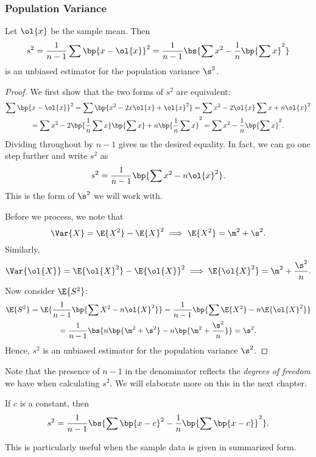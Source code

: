 \subsubsection{Population Variance}

\begin{proposition}
    Let $\ol{x}$ be the sample mean. Then \[s^2 = \frac{1}{n-1} \sum \bp{x - \ol{x}}^2 = \frac1{n-1} \bs{\sum x^2 - \frac1n \bp{\sum x}^2}\] is an unbiased estimator for the population variance $\s^2$.
\end{proposition}
\begin{proof}
    We first show that the two forms of $s^2$ are equivalent:
    \begin{gather*}
        \sum \bp{x - \ol{x}}^2 = \sum \bp{x^2 - 2x\ol{x} + \ol{x}^2} = \sum x^2 - 2\ol{x} \sum x + n \ol{x}^2\\
        = \sum x^2 - 2\bp{\frac1n \sum x}\bp{\sum x} + n \bp{\frac1{n} \sum x}^2 = \sum x^2 - \frac1n \bp{\sum x}^2.
    \end{gather*}
    Dividing throughout by $n-1$ gives us the desired equality. In fact, we can go one step further and write $s^2$ as \[s^2 = \frac1{n-1} \bp{\sum x^2 - n \ol{x}^2}.\] This is the form of $\s^2$ we will work with.

    Before we process, we note that \[\Var{X} = \E{X^2} - \E{X}^2 \implies \E{X^2} = \m^2 + \s^2.\] Similarly, \[\Var{\ol{X}} = \E{\ol{X}^2} - \E{\ol{X}}^2 \implies \E{\ol{X}^2} = \m^2 + \frac{\s^2}{n}.\] Now consider $\E{S^2}$:
    \begin{gather*}
        \E{S^2} = \E{\frac1{n-1} \bp{\sum X^2 - n \ol{X}^2}} = \frac1{n-1} \bp{\sum \E{X^2} - n \E{\ol{X}^2}}\\
        = \frac1{n-1} \bs{n \bp{\m^2 + \s^2} - n \bp{\m^2 + \frac{\s^2}{n}}} = \s^2.
    \end{gather*}
    Hence, $s^2$ is an unbiased estimator for the population variance $\s^2$.
\end{proof}

Note that the presence of $n-1$ in the denominator reflects the \emph{degrees of freedom} we have when calculating $s^2$. We will elaborate more on this in the next chapter.

\begin{corollary}
    If $c$ is a constant, then \[s^2 = \frac1{n-1} \bs{\sum \bp{x-c}^2 - \frac1n \bp{\sum \bp{x-c}}^2}.\]
\end{corollary}

This is particularly useful when the sample data is given in summarized form.

